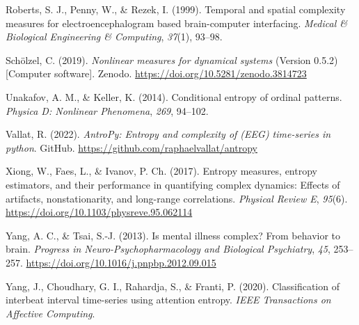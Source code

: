 \documentclass[
  man]{apa6}
\newlength{\cslhangindent}
\newlength{\cslentryspacingunit} %
\newenvironment{CSLReferences}[2] %
 {%
  \setlength{\parindent}{0pt}
  \ifodd #1
  \let\oldpar\par
  \def\par{\hangindent=\cslhangindent\oldpar}
  \fi
  \setlength{\parskip}{#2\cslentryspacingunit}
 }%
 {}
\begin{document}
\begin{CSLReferences}{1}{0}
\leavevmode{}%
Roberts, S. J., Penny, W., \& Rezek, I. (1999). Temporal and spatial complexity measures for electroencephalogram based brain-computer interfacing. \emph{Medical \& Biological Engineering \& Computing}, \emph{37}(1), 93--98.

\leavevmode{}%
Schölzel, C. (2019). \emph{Nonlinear measures for dynamical systems} (Version 0.5.2) {[}Computer software{]}. Zenodo. \url{https://doi.org/10.5281/zenodo.3814723}

\leavevmode{}%
Unakafov, A. M., \& Keller, K. (2014). Conditional entropy of ordinal patterns. \emph{Physica D: Nonlinear Phenomena}, \emph{269}, 94--102.

\leavevmode{}%
Vallat, R. (2022). \emph{AntroPy: Entropy and complexity of (EEG) time-series in python}. GitHub. \url{https://github.com/raphaelvallat/antropy}

\leavevmode{}%
Xiong, W., Faes, L., \& Ivanov, P. Ch. (2017). Entropy measures, entropy estimators, and their performance in quantifying complex dynamics: Effects of artifacts, nonstationarity, and long-range correlations. \emph{Physical Review E}, \emph{95}(6). \url{https://doi.org/10.1103/physreve.95.062114}

\leavevmode{}%
Yang, A. C., \& Tsai, S.-J. (2013). Is mental illness complex? From behavior to brain. \emph{Progress in Neuro-Psychopharmacology and Biological Psychiatry}, \emph{45}, 253--257. \url{https://doi.org/10.1016/j.pnpbp.2012.09.015}

\leavevmode{}%
Yang, J., Choudhary, G. I., Rahardja, S., \& Franti, P. (2020). Classification of interbeat interval time-series using attention entropy. \emph{IEEE Transactions on Affective Computing}.

\end{CSLReferences}


\clearpage
\renewcommand{\listfigurename}{Figure captions}
\end{document}
